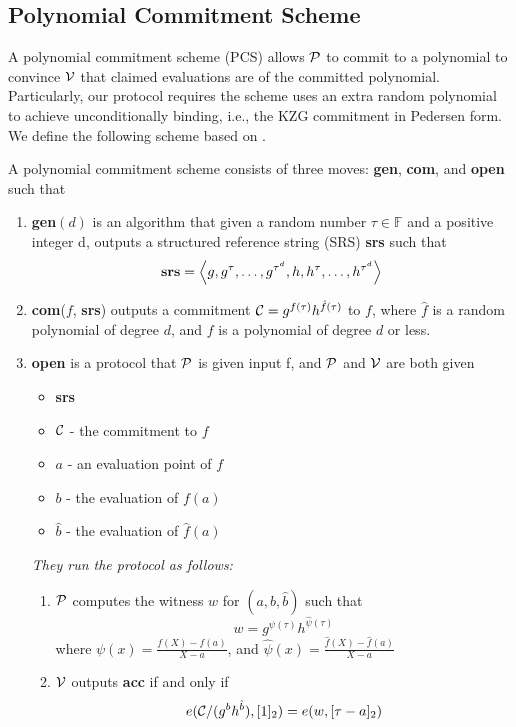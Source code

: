 \subsection{Polynomial Commitment Scheme}
A polynomial commitment scheme (PCS) allows $\mathcal{P}$ to commit to a polynomial to convince $\mathcal{V}$ that claimed evaluations are of the committed polynomial. Particularly, our protocol requires the scheme uses an extra random polynomial to achieve unconditionally binding, i.e., the KZG commitment in Pedersen form. We define the following scheme based on \cite{kzg,plonk,bdfg}.
\begin{definition}
\label{def:pcs}
A polynomial commitment scheme consists of three moves: \textbf{gen}, \textbf{com}, and \textbf{open} such that
\begin{enumerate}
    \item \textbf{gen}$(d)$ is an algorithm that given a random number $\tau\in\mathbb{F}$ and a positive integer d, outputs a structured reference string (SRS) \textbf{srs} such that
    \[ \textbf{srs}=\left \langle g,g^\tau,\dots,g^{\tau^d},h,h^\tau,\dots,h^{\tau^d} \right \rangle \]
    \item \textbf{com}($f$, \textbf{srs}) outputs a commitment $\mathcal{C}=g^{f(\tau)}h^{\hat{f}(\tau)}$ to $f$, where $\hat{f}$ is a random polynomial of degree $d$, and $f$ is a polynomial of degree $d$ or less.
    \item \textbf{open} is a protocol that $\mathcal{P}$ is given input f, and $\mathcal{P}$ and $\mathcal{V}$ are both given
    \begin{itemize}
        \item \textbf{srs}
        \item $\mathcal{C}$ - the commitment to $f$
        \item $a$ - an evaluation point of $f$
        \item $b$ - the evaluation of $f(a)$
        \item $\hat{b}$ - the evaluation of $\hat{f}(a)$
    \end{itemize}
    \textit{They run the protocol as follows:}
    \begin{enumerate}
        \item $\mathcal{P}$ computes the witness $w$ for $(a,b,\hat{b})$ such that
        \[ w=g^{\psi(\tau)}h^{\hat\psi(\tau)} \]
        where $\psi(x)=\frac{f(X)-f(a)}{X-a}$, and $\hat\psi(x)=\frac{\hat{f}(X)-\hat{f}(a)}{X-a}$
        \item $\mathcal{V}$ outputs \textbf{acc} if and only if
        \[ e(\mathcal{C}/(g^bh^{\hat{b}}),[1]_2)=e(w,[\tau-a]_2) \]
    \end{enumerate}

\end{enumerate}
\end{definition}
